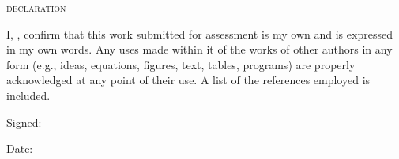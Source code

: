 
\makeatletter

\begin{center}
  \begin{large}
    \textsc{declaration}
  \end{large}
\end{center}

\noindent I, {\@author}, confirm that this work submitted for assessment is my own and is expressed 
in my own words. Any uses made within it of the works of other authors in any form (e.g., 
ideas, equations, figures, text, tables, programs) are properly acknowledged at any point 
of their use. A list of the references employed is included.
 
\bigskip
 
\noindent Signed: {\@author}

\bigskip

\noindent Date: {\@date}

\makeatother

\newpage
